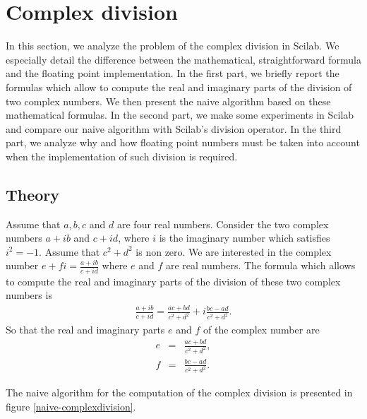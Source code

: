 %

\section{Complex division}

In this section, we analyze the problem of the complex division in Scilab.
We especially detail the difference between the mathematical, straightforward
formula and the floating point implementation. In the first part, we briefly report 
the formulas which allow to 
compute the real and imaginary parts of the division of two complex numbers.
We then present the naive algorithm based on these mathematical formulas. 
In the second part, we make some experiments in Scilab and compare our
naive algorithm with Scilab's division operator.
In the third part, we analyze 
why and how floating point numbers must be taken into account when the 
implementation of such division is required.

\subsection{Theory}

Assume that $a,b,c$ and $d$ are four real numbers.
Consider the two complex numbers $a + ib$ and $c + id$, where $i$ is 
the imaginary number which satisfies $i^2=-1$. Assume that $c^2 + d^2$ is non zero.
We are interested in the complex number $e+fi = \frac{a + ib}{c + id}$ where $e$ and $f$ are real
numbers.
The formula which allows to compute the real and imaginary parts 
of the division of these two complex numbers is 
\begin{eqnarray}
\label{compdiv-eq-defcomplexdiv}
\frac{a + ib}{c + id} = \frac{ac + bd}{c^2 + d^2} + i \frac{bc - ad}{c^2 + d^2} .
\end{eqnarray}
So that the real and imaginary parts $e$ and $f$ of the complex number are
\begin{eqnarray}
\label{compdiv-eq-e}
e &=& \frac{ac + bd}{c^2 + d^2}, \\
\label{compdiv-eq-f}
f &=& \frac{bc - ad}{c^2 + d^2}.
\end{eqnarray}

The naive algorithm for the computation of the complex division
is presented in figure \ref{naive-complexdivision}.

